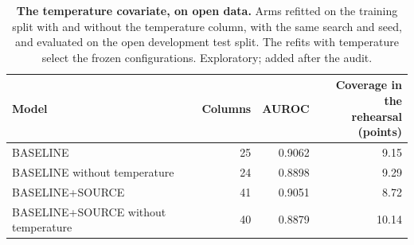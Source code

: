 \documentclass[11pt]{article}
\begin{document}
\begin{table}[h]
\centering
\small
\caption{\textbf{The temperature covariate, on open data.} Arms refitted on the training split with and without the temperature column, with the same search and seed, and evaluated on the open development test split. The refits with temperature select the frozen configurations. Exploratory; added after the audit.}
\label{tab:temperature}
\begin{tabular}{@{}lrrr@{}}
\toprule
Model & Columns & AUROC & \shortstack[r]{Coverage in the\\rehearsal (points)} \\
\midrule
BASELINE & 25 & 0.9062 & 9.15 \\
BASELINE without temperature & 24 & 0.8898 & 9.29 \\
BASELINE+SOURCE & 41 & 0.9051 & 8.72 \\
BASELINE+SOURCE without temperature & 40 & 0.8879 & 10.14 \\
\bottomrule
\end{tabular}
\end{table}
\end{document}
